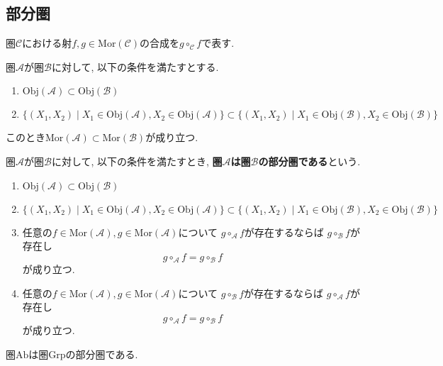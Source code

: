 \subsection{部分圏}
\begin{Notation}
圏$\mathscr{C}$における射$f,g\in\mathrm{Mor}(\mathscr{C})$の合成を$g\circ_{\mathscr{C}}f$で表す.
\end{Notation}
\begin{Prop}
圏$\mathscr{A}$が圏$\mathscr{B}$に対して, 以下の条件を満たすとする.
\begin{enumerate}
\item
$\mathrm{Obj}(\mathscr{A})\subset\mathrm{Obj}(\mathscr{B})$
\item
$\{(X_1,X_2)\mid X_1\in\mathrm{Obj}(\mathscr{A}),X_2\in \mathrm{Obj}(\mathscr{A})\}
\subset
\{(X_1,X_2)\mid X_1\in\mathrm{Obj}(\mathscr{B}),X_2\in \mathrm{Obj}(\mathscr{B})\}
$
\end{enumerate}
このとき$\mathrm{Mor}(\mathscr{A})\subset\mathrm{Mor}(\mathscr{B})$が成り立つ.
\end{Prop}
\begin{comment}
\begin{proof}
\end{proof}
\end{comment}

\begin{Def}
圏$\mathscr{A}$が圏$\mathscr{B}$に対して, 以下の条件を満たすとき, {\bf 圏$\mathscr{A}$は圏$\mathscr{B}$の部分圏である}という.
\begin{enumerate}
\item
$\mathrm{Obj}(\mathscr{A})\subset\mathrm{Obj}(\mathscr{B})$
\item
$\{(X_1,X_2)\mid X_1\in\mathrm{Obj}(\mathscr{A}),X_2\in \mathrm{Obj}(\mathscr{A})\}
\subset
\{(X_1,X_2)\mid X_1\in\mathrm{Obj}(\mathscr{B}),X_2\in \mathrm{Obj}(\mathscr{B})\}
$
\item 任意の$f\in\mathrm{Mor}(\mathscr{A}), g\in\mathrm{Mor}(\mathscr{A})$について
$g\circ_{\mathscr{A}}f$が存在するならば
$g\circ_{\mathscr{B}}f$が存在し
\[
g\circ_{\mathscr{A}}f=g\circ_{\mathscr{B}}f
\]
が成り立つ.
\item 任意の$f\in\mathrm{Mor}(\mathscr{A}), g\in\mathrm{Mor}(\mathscr{A})$について
$g\circ_{\mathscr{B}}f$が存在するならば
$g\circ_{\mathscr{A}}f$が存在し
\[
g\circ_{\mathscr{A}}f=g\circ_{\mathscr{B}}f
\]
が成り立つ.
\end{enumerate}
\end{Def}
\begin{Prop}
圏$\mathrm{Ab}$は圏$\mathrm{Grp}$の部分圏である.
\end{Prop}
\begin{comment}
\begin{proof}
\end{proof}
\end{comment}

